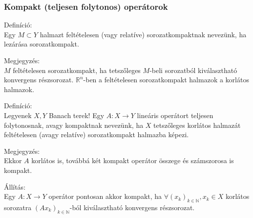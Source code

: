 \documentclass[12pt,a4paper]{scrartcl}
\newenvironment{definicio}{}{}
\newenvironment{allitas}{}{}
\newenvironment{megjegyzes}{}{}
\begin{document}
\hypertarget{kompakt-teljesen-folytonos-operatorok}{%
\subsubsection{Kompakt (teljesen folytonos)
operátorok}\label{kompakt-teljesen-folytonos-operatorok}}

\begin{definicio}

Definíció:\\
Egy \(M \subset Y\) halmazt feltételesen (vagy relatíve)
sorozatkompaktnak nevezünk, ha lezárása sorozatkompakt.

\end{definicio}

\begin{megjegyzes}

Megjegyzés:\\
\(M\) feltételesen sorozatkompakt, ha tetszőleges \(M\)-beli sorozatból
kiválasztható konvergens részsorozat. \({\mathbb{R}}^{n}\)-ben a
feltételesen sorozatkompakt halmazok a korlátos halmazok.

\end{megjegyzes}

\begin{definicio}

Definíció:\\
Legyenek \(X,Y\) Banach terek! Egy \(\left. A:X\rightarrow Y \right.\)
lineáris operátort teljesen folytonosnak, avagy kompaktnak nevezünk, ha
\(X\) tetszőleges korlátos halmazát feltételesen (avagy relatíve)
sorozatkompakt halmazba képezi.

\end{definicio}

\begin{megjegyzes}

Megjegyzés:\\
Ekkor \(A\) korlátos is, továbbá két kompakt operátor összege és
számszorosa is kompakt.

\end{megjegyzes}

\begin{allitas}

Állítás:\\
Egy \(\left. A:X\rightarrow Y \right.\) operátor pontosan akkor kompakt,
ha \(\forall\left( x_{k} \right)_{k \in {\mathbb{N}}},x_{k} \in X\)
korlátos sorozatra \(\left( {Ax_{k}} \right)_{k \in {\mathbb{N}}}\)-ból
kiválasztható konvergens részsorozat.

\end{allitas}
\end{document}
